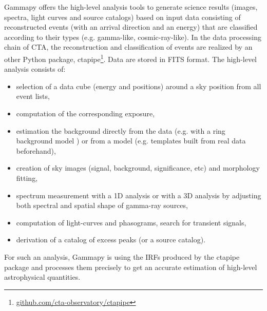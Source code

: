 \documentclass{PoS}
\newcommand{\urlCtaPipe}{\href{https://github.com/cta-observatory/ctapipe}{github.com/cta-observatory/ctapipe}}
\begin{document}
Gammapy offers the high-level analysis tools to generate science results
(images, spectra, light curves and source catalogs) based on input data
consisting of  reconstructed events (with an arrival direction and an energy)
that are  classified according to their types (e.g. gamma-like,
cosmic-ray-like).  In the data processing chain of CTA, the reconstruction and
classification  of events are realized by an other Python package,
ctapipe\footnote{\urlCtaPipe}. Data are stored in FITS format.  The high-level
analysis consists of:
\vspace{-0.3cm}
\begin{itemize}
\setlength\itemsep{-0.5em}

\item selection of a data cube (energy and positions) around a sky position from
all event lists,

\item computation of the corresponding exposure,

\item estimation the background directly from the data (e.g. with a
ring background model \cite{berge}) or from a model (e.g. templates built from
real data beforehand),

\item creation of sky images (signal, background, significance, etc) and
morphology fitting,

\item spectrum measurement with a 1D analysis or with a 3D analysis by adjusting both spectral and spatial shape of gamma-ray sources,

\item computation of light-curves and phasograms, search for transient signals,

\item derivation of a catalog of excess peaks (or a source catalog).

\end{itemize}
\vspace{-0.28cm}
For such an analysis, Gammapy is using the IRFs produced by the ctapipe  package
and processes them precisely to get an accurate estimation of high-level
astrophysical quantities.
\end{document}
